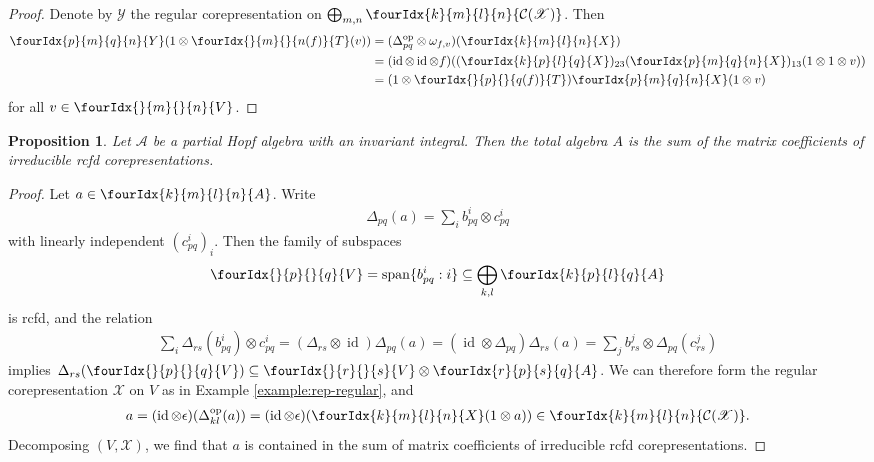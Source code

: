 \documentclass[10pt]{article}
\DeclareMathOperator{\id}{id}
\DeclareMathOperator{\op}{\mathrm{op}}
\newcommand{\Gr}[5]{\fourIdx{#2}{#4}{#3}{#5}{#1}}%
\newcommand{\Gru}[3]{\Gr{#1}{}{}{#2}{#3}}
\newtheorem{Prop}[Theorem]{Proposition}
\theoremstyle{definition}
\numberwithin{equation}{section}
\begin{document}
\begin{proof}
  Denote by $\mathscr{Y}$ the regular corepresentation on
  $\bigoplus_{m,n } \Gr{\mathcal{C}(\mathscr{X})}{k}{l}{m}{n}$. Then
  \begin{align*}
    \label{eq:1}
 \Gr{Y}{p}{q}{m}{n}    (1\otimes \Gr{T}{}{}{m}{n(f)}(v)) &= 
(\Delta^{\op}_{pq} \otimes \omega_{f,v})( \Gr{X}{k}{l}{m}{n}) 
\\ & = (\id \otimes \id \otimes
f)((\Gr{X}{k}{l}{p}{q})_{23}(\Gr{X}{p}{q}{m}{n})_{13}(1 \otimes 1
 \otimes v)) \\ &=(1 \otimes \Gr{T}{}{}{p}{q(f)})\Gr{X}{p}{q}{m}{n}(1 \otimes v)
  \end{align*}
for all $v \in \Gru{V}{m}{n}$.
\end{proof}
\begin{Prop} \label{prop:rep-weak-pw} Let $\mathscr{A}$ be a partial
  Hopf algebra with an invariant integral. Then the total algebra $A$ is the sum
  of the matrix coefficients of irreducible rcfd corepresentations.
\end{Prop}
\begin{proof} 
  Let $a \in \Gr{A}{k}{l}{m}{n}$. Write
  \begin{align*}
    \Delta_{pq}(a)=\sum_{i} b_{pq}^{i} \otimes c^{i}_{pq}
  \end{align*}
 with linearly independent
  $(c_{pq}^{i})_{i}$. Then the family of subspaces
  \begin{align*}
    \Gru{V}{p}{q} = \mathrm{span}\{b_{pq}^{i} : i \}\subseteq \bigoplus_{k,l}
  \Gr{A}{k}{l}{p}{q}
  \end{align*}
is rcfd, and the relation
  \begin{align*}
 \sum_{i}
    \Delta_{rs}(b^{i}_{pq}) \otimes c^{i}_{pq} =
    (\Delta_{rs} \otimes \id)\Delta_{pq}(a) = (\id \otimes
    \Delta_{pq}) \Delta_{rs}(a) = \sum_{j} b^{j}_{rs} \otimes
    \Delta_{pq}(c^{j}_{rs})
  \end{align*}
  implies $\Delta_{rs}(\Gru{V}{p}{q}) \subseteq \Gru{V}{r}{s} \otimes
  \Gr{A}{r}{s}{p}{q}$.  We can therefore form the regular
  corepresentation $\mathscr{X}$ on $V$ as in Example \ref{example:rep-regular}, and
  \begin{align*}
    a = (\id \otimes \epsilon)(\Delta^{\op}_{kl}(a)) =
    (\id \otimes \epsilon)(\Gr{X}{k}{l}{m}{n}(1 \otimes a)) \in
    \Gr{\mathcal{C}(\mathscr{X})}{k}{l}{m}{n}.
  \end{align*}
  Decomposing $(V,\mathscr{X})$, we find that
  $a$ is contained in the sum of matrix coefficients of irreducible
rcfd  corepresentations.
\end{proof}
\end{document}
